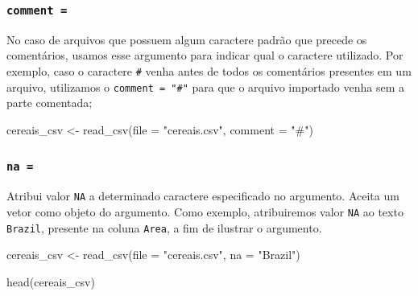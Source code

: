\documentclass[
  brazilian,
]{book}
\newenvironment{Shaded}{\begin{snugshade}}{\end{snugshade}}
\newcommand{\AttributeTok}[1]{\textcolor[rgb]{0.77,0.63,0.00}{#1}}
\newcommand{\FunctionTok}[1]{\textcolor[rgb]{0.00,0.00,0.00}{#1}}
\newcommand{\NormalTok}[1]{#1}
\newcommand{\OtherTok}[1]{\textcolor[rgb]{0.56,0.35,0.01}{#1}}
\newcommand{\StringTok}[1]{\textcolor[rgb]{0.31,0.60,0.02}{#1}}
\begin{document}
\hypertarget{comment}{%
\subsubsection*{\texorpdfstring{\texttt{comment\ =}}{comment =}}\label{comment}}

No caso de arquivos que possuem algum caractere padrão que precede os comentários, usamos esse argumento para indicar qual o caractere utilizado. Por exemplo, caso o caractere \texttt{\#} venha antes de todos os comentários presentes em um arquivo, utilizamos o \texttt{comment\ =\ "\#"} para que o arquivo importado venha sem a parte comentada;

\begin{Shaded}
\begin{Highlighting}[]
\NormalTok{cereais\_csv }\OtherTok{\textless{}{-}} \FunctionTok{read\_csv}\NormalTok{(}\AttributeTok{file =} \StringTok{"cereais.csv"}\NormalTok{,}
                        \AttributeTok{comment =} \StringTok{"\#"}\NormalTok{)}
\end{Highlighting}
\end{Shaded}

\hypertarget{na-1}{%
\subsubsection*{\texorpdfstring{\texttt{na\ =}}{na =}}\label{na-1}}

Atribui valor \texttt{NA} a determinado caractere especificado no argumento. Aceita um vetor como objeto do argumento. Como exemplo, atribuiremos valor \texttt{NA} ao texto \texttt{Brazil}, presente na coluna \texttt{Area}, a fim de ilustrar o argumento.

\begin{Shaded}
\begin{Highlighting}[]
\NormalTok{cereais\_csv }\OtherTok{\textless{}{-}} \FunctionTok{read\_csv}\NormalTok{(}\AttributeTok{file =} \StringTok{"cereais.csv"}\NormalTok{,}
                        \AttributeTok{na =} \StringTok{"Brazil"}\NormalTok{)}

\FunctionTok{head}\NormalTok{(cereais\_csv)}
\end{Highlighting}
\end{Shaded}
\end{document}

